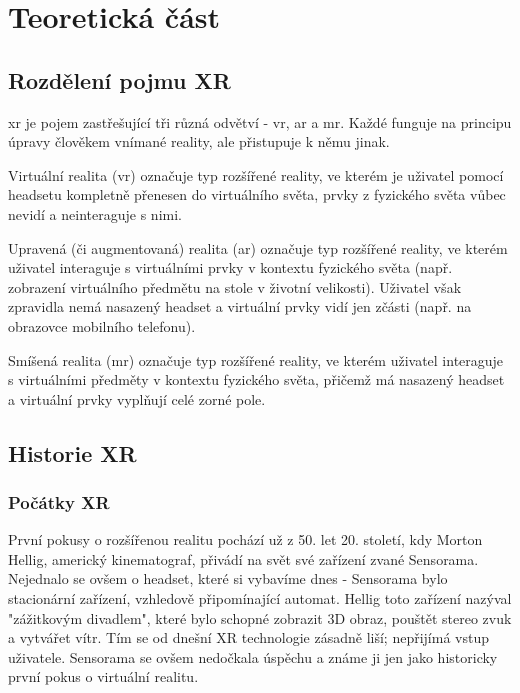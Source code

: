 \part{Teoretická část}

\chapter{Rozdělení pojmu XR}

\gls{xr} je pojem zastřešující tři různá odvětví - \gls{vr}, \gls{ar} a \gls{mr}. Každé funguje na principu úpravy člověkem vnímané reality, ale přistupuje k němu jinak.

Virtuální realita (\gls{vr}) označuje typ rozšířené reality, ve kterém je uživatel pomocí headsetu kompletně přenesen do virtuálního světa, prvky z fyzického světa vůbec nevidí a neinteraguje s nimi.

Upravená (či augmentovaná) realita (\gls{ar}) označuje typ rozšířené reality, ve kterém uživatel interaguje s virtuálními prvky v kontextu fyzického světa (např. zobrazení virtuálního předmětu na stole v životní velikosti). Uživatel však zpravidla nemá nasazený headset a virtuální prvky vidí jen zčásti (např. na obrazovce mobilního telefonu).

Smíšená realita (\gls{mr}) označuje typ rozšířené reality, ve kterém uživatel interaguje s virtuálními předměty v kontextu fyzického světa, přičemž má nasazený headset a virtuální prvky vyplňují celé zorné pole.

\chapter{Historie XR}

\section{Počátky XR}

První pokusy o rozšířenou realitu pochází už z 50. let 20. století, kdy Morton Hellig, americký kinematograf, přivádí na svět své zařízení zvané Sensorama. Nejednalo se ovšem o headset, které si vybavíme dnes - Sensorama bylo stacionární zařízení, vzhledově připomínající automat. Hellig toto zařízení nazýval "zážitkovým divadlem", které bylo schopné zobrazit 3D obraz, pouštět stereo zvuk a vytvářet vítr. Tím se od dnešní XR technologie zásadně liší; nepřijímá vstup uživatele. Sensorama se ovšem nedočkala úspěchu a známe ji jen jako historicky první pokus o virtuální realitu. \cite{otechnice}

